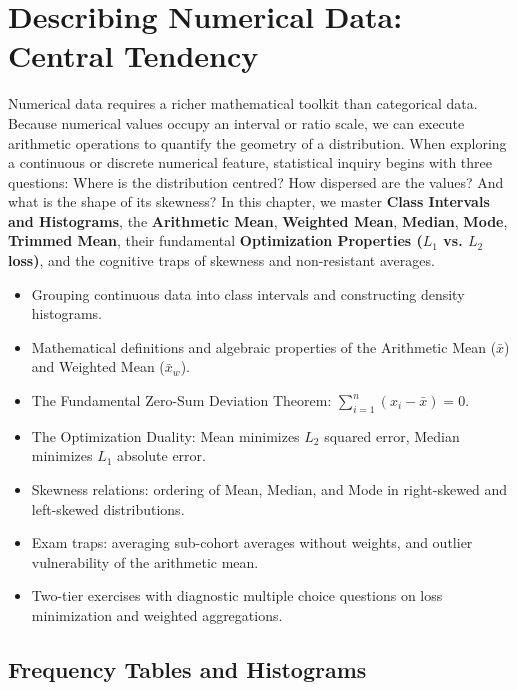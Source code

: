 \chapter{Describing Numerical Data: Central Tendency}

Numerical data requires a richer mathematical toolkit than categorical data. Because numerical values occupy an interval or ratio scale, we can execute arithmetic operations to quantify the geometry of a distribution. When exploring a continuous or discrete numerical feature, statistical inquiry begins with three questions: Where is the distribution centred? How dispersed are the values? And what is the shape of its skewness? In this chapter, we master \textbf{Class Intervals and Histograms}, the \textbf{Arithmetic Mean}, \textbf{Weighted Mean}, \textbf{Median}, \textbf{Mode}, \textbf{Trimmed Mean}, their fundamental \textbf{Optimization Properties ($L_1$ vs. $L_2$ loss)}, and the cognitive traps of skewness and non-resistant averages.

\vspace{0.5cm}
\begin{tcolorbox}[colback=primarylight, colframe=primarydark, title={\textbf{What You'll Learn in this Chapter}}]
\begin{itemize}
    \item Grouping continuous data into class intervals and constructing density histograms.
    \item Mathematical definitions and algebraic properties of the Arithmetic Mean ($\bar{x}$) and Weighted Mean ($\bar{x}_w$).
    \item The Fundamental Zero-Sum Deviation Theorem: $\sum_{i=1}^n (x_i - \bar{x}) = 0$.
    \item The Optimization Duality: Mean minimizes $L_2$ squared error, Median minimizes $L_1$ absolute error.
    \item Skewness relations: ordering of Mean, Median, and Mode in right-skewed and left-skewed distributions.
    \item Exam traps: averaging sub-cohort averages without weights, and outlier vulnerability of the arithmetic mean.
    \item Two-tier exercises with diagnostic multiple choice questions on loss minimization and weighted aggregations.
\end{itemize}
\end{tcolorbox}

\section{Frequency Tables and Histograms}

